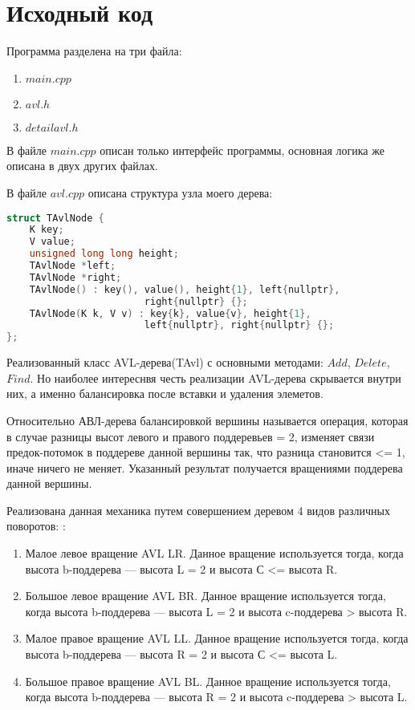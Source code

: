 \pagebreak

\section{Исходный код}

Программа разделена на три файла:
\begin{enumerate}
    \item $main.cpp$
    \item $avl.h$
    \item $detail avl.h$
\end{enumerate}

В файле $main.cpp$ описан только интерфейс программы, основная логика же описана в двух других файлах.\newline

В файле $avl.cpp$ описана структура узла моего дерева:
\begin{lstlisting}[language=C]
struct TAvlNode {
	K key;
	V value;
	unsigned long long height;
	TAvlNode *left;
	TAvlNode *right;
	TAvlNode() : key(), value(), height{1}, left{nullptr}, 
						right{nullptr} {};
	TAvlNode(K k, V v) : key{k}, value{v}, height{1}, 
						left{nullptr}, right{nullptr} {};
};
\end{lstlisting}


Реализованный класс AVL-дерева(TAvl) с основными методами: $Add$, $Delete$, $Find$.
Но наиболее интереснвя честь реализации AVL-дерева скрывается внутри них, а именно балансировка после вставки и удаления элеметов.\newline

Относительно АВЛ-дерева балансировкой вершины называется операция, которая в случае разницы высот левого и правого поддеревьев = 2, изменяет связи предок-потомок в поддереве данной вершины так, что разница становится <= 1, иначе ничего не меняет. Указанный результат получается вращениями поддерева данной вершины.\newline

Реализована данная механика путем совершением деревом 4 видов различных поворотов: \cite{wikipedia_avl_tree}:
\begin{enumerate}
    \item Малое левое вращение AVL LR.
Данное вращение используется тогда, когда высота b-поддерева — высота L = 2 и высота С <= высота R.
    \item Большое левое вращение AVL BR.
Данное вращение используется тогда, когда высота b-поддерева — высота L = 2 и высота c-поддерева > высота R.
    \item Малое правое вращение AVL LL.
Данное вращение используется тогда, когда высота b-поддерева — высота R = 2 и высота С <= высота L.
    \item Большое правое вращение AVL BL.
Данное вращение используется тогда, когда высота b-поддерева — высота R = 2 и высота c-поддерева > высота L.
\end{enumerate}

